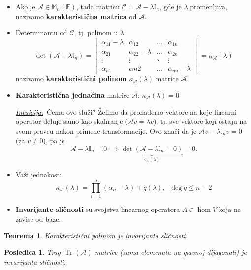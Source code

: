 \documentclass[a4paper,12pt,twoside]{report}
\newtheorem{theorem}{Teorema}[section]
\newtheorem{corollary}{Posledica}[theorem]
\numberwithin{algorithm}{section}
\newcommand{\intuicija}{\noindent\underline{\textit{Intuicija:}}\ }
\begin{document}
\begin{itemize}
    \item Ako je $\mathcal{A} \in \mathbb{M}_n(\mathbb{F})$, tada matricu $\mathcal{C} = \mathcal{A} - \lambda\mathbb{I}_n$, 
    gde je $\lambda$ promenljiva, nazivamo \textbf{karakteristična matrica} od $\mathcal{A}$.
    \item Determinantu od $\mathcal{C}$, tj. polinom u $\lambda$:
    \[ \det(\mathcal{A} - \lambda \mathbb{I}_n) = \begin{vmatrix}
        \alpha_{11} - \lambda & \alpha_{12} & \dots & \alpha_{1n}\\
        \alpha_{21} & \alpha_{22}-\lambda & \dots & \alpha_{2n} \\
        \vdots & \vdots & \ddots & \vdots \\
        \alpha_{n1} & \alpha{n2} & \dots & \alpha_{nn} - \lambda
    \end{vmatrix} = \kappa_\mathcal{A}(\lambda)\]
    nazivamo \textbf{karakteristični polinom} $\kappa_\mathcal{A}(\lambda)$ matrice $\mathcal{A}$.
    \item \textbf{Karakteristična jednačina} matrice $\mathcal{A}$: $\kappa_\mathcal{A}(\lambda) = 0$

    \intuicija Čemu ovo služi? Želimo da pronađemo vektore na koje linearni operator deluje samo kao skaliranje ($\mathcal{A}v = \lambda v$), tj. sve vektore koji 
    ostaju na svom pravcu nakon primene transformacije. Ovo znači da je $\mathcal{A}v - \lambda\mathbb{I}_n v = 0$ (za $v \neq 0$), pa je 
    \[ \mathcal{A} - \lambda\mathbb{I}_n = 0 \implies \underbrace{\det (\mathcal{A} - \lambda\mathbb{I}_n = 0)}_{\kappa_A(\lambda)} = 0. \]

    \item Važi jednakost:
    \[ \kappa_\mathcal{A}(\lambda) = \prod^{n}_{i = 1} (\alpha_{ii} - \lambda) + q(\lambda), \;\; \deg q \leq n-2 \]
    \item \textbf{Invarijante sličnosti} su svojstva linearnog operatora $A \in \hom V$ koja ne zavise od baze.
\end{itemize}

\begin{theorem}
    Karakteristični polinom je invarijanta sličnosti.
\end{theorem}

\begin{corollary}
    Trag $\operatorname{Tr}(\mathcal{A})$ matrice (suma elemenata na glavnoj dijagonali) je invarijanta sličnosti.
\end{corollary}
\end{document}
